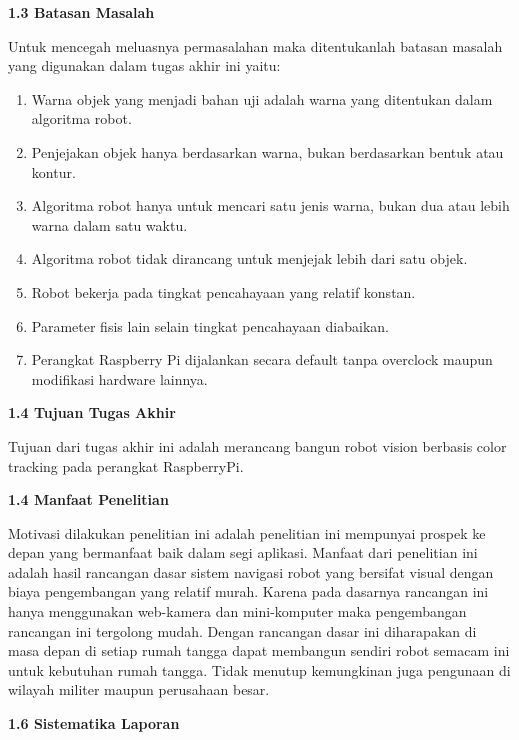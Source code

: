\documentclass{article}
\begin{document}
\noindent \textbf{1.3 Batasan Masalah}

Untuk mencegah meluasnya permasalahan maka ditentukanlah batasan masalah yang digunakan dalam tugas akhir ini yaitu:
\begin{enumerate}
 \item Warna objek yang menjadi bahan uji adalah warna yang ditentukan dalam algoritma robot.
 \item Penjejakan objek hanya berdasarkan warna, bukan berdasarkan bentuk atau kontur.
 \item Algoritma robot hanya untuk mencari satu jenis warna, bukan dua atau lebih warna dalam satu waktu.
 \item Algoritma robot tidak dirancang untuk menjejak lebih dari satu objek.
 \item Robot bekerja pada tingkat pencahayaan yang relatif konstan.
 \item Parameter fisis lain selain tingkat pencahayaan diabaikan.
 \item Perangkat Raspberry Pi dijalankan secara default tanpa overclock maupun modifikasi hardware lainnya.
\end{enumerate}

\vspace{2pt}

\noindent \textbf{1.4 Tujuan Tugas Akhir}

Tujuan dari tugas akhir ini adalah merancang bangun robot vision berbasis color tracking pada perangkat RaspberryPi.
\\
\vspace{2pt}

\noindent \textbf{1.4 Manfaat Penelitian}

Motivasi dilakukan penelitian ini adalah penelitian ini mempunyai prospek ke depan yang bermanfaat baik dalam segi aplikasi.
Manfaat dari penelitian ini adalah hasil rancangan dasar sistem navigasi robot yang bersifat visual dengan biaya pengembangan yang relatif murah.
Karena pada dasarnya rancangan ini hanya menggunakan web-kamera dan mini-komputer maka pengembangan rancangan ini tergolong mudah.
Dengan rancangan dasar ini diharapakan di masa depan di setiap rumah tangga dapat membangun sendiri robot semacam ini untuk kebutuhan rumah tangga.
Tidak menutup kemungkinan juga pengunaan di wilayah militer maupun perusahaan besar.
\\
\vspace{2pt}

\noindent \textbf{1.6 Sistematika Laporan}
\end{document}
